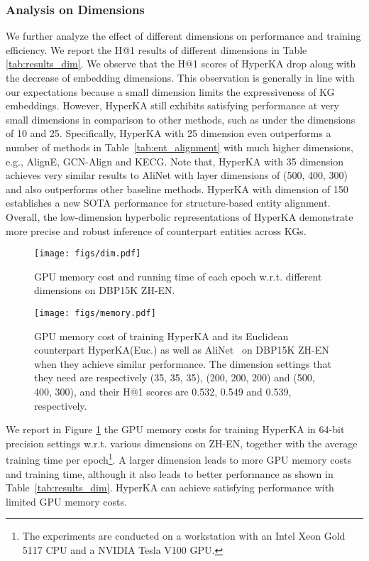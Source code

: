\documentclass[11pt,a4paper]{article}
\newcommand{\modelname}{HyperKA\xspace}
\begin{document}
\subsubsection{Analysis on Dimensions}
We further analyze the effect of different dimensions on performance and training efficiency. We report the H@1 results of different dimensions in Table \ref{tab:results_dim}. We observe that the H@1 scores of \modelname drop along with the decrease of embedding dimensions. This observation is generally in line with our expectations because a small dimension limits the expressiveness of KG embeddings. However, \modelname still exhibits satisfying performance at very small dimensions in comparison to other methods, such as under the dimensions of 10 and 25. Specifically, \modelname with 25 dimension even outperforms a number of methods in Table~\ref{tab:ent_alignment} with much higher dimensions, e.g., AlignE, GCN-Align and KECG. Note that, \modelname with 35 dimension achieves very similar results to AliNet with layer dimensions of (500, 400, 300) and also outperforms other baseline methods. \modelname with dimension of 150 establishes a new SOTA performance for structure-based entity alignment. Overall, the low-dimension hyperbolic representations of \modelname demonstrate more precise and robust inference of counterpart entities across KGs.

\begin{figure}[t]
	\centering
	\texttt{[image: figs/dim.pdf]}
	\caption{GPU memory cost and running time of each epoch w.r.t. different dimensions on DBP15K ZH-EN.}
	\label{fig:dim}
\end{figure}

\begin{figure}[!t]
	\centering
	\texttt{[image: figs/memory.pdf]}
	\caption{GPU memory cost of training \modelname and its Euclidean counterpart \modelname (Euc.) as well as AliNet~\cite{AliNet} on DBP15K ZH-EN when they achieve similar performance. The dimension settings that they need are respectively (35, 35, 35), (200, 200, 200) and (500, 400, 300), and their H@1 scores are 0.532, 0.549 and 0.539, respectively.}
	\label{fig:memory}
\end{figure}

We report in Figure \ref{fig:dim} the GPU memory costs for training \modelname in 64-bit precision settings w.r.t. various dimensions on ZH-EN, together with the average training time per epoch\footnote{The experiments are conducted on a workstation with an Intel Xeon Gold 5117 CPU and a NVIDIA Tesla V100 GPU.}. A larger dimension leads to more GPU memory costs and training time, although it also leads to better performance as shown in Table~\ref{tab:results_dim}. \modelname can achieve satisfying performance with limited GPU memory costs.
\end{document}
